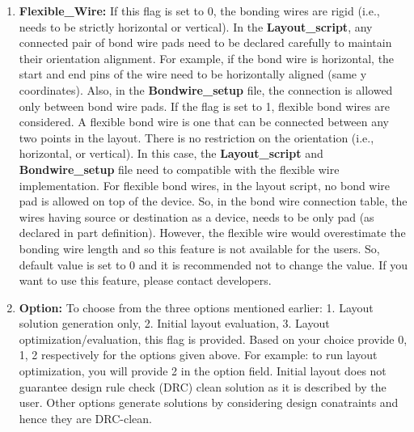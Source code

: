 \documentclass[11pt]{article}
\begin{document}
\begin{enumerate}
	 \item \textbf{Flexible\_Wire:}
	 If this flag is set to 0, the bonding wires are rigid (i.e., needs to be strictly horizontal or vertical). In the \textbf{Layout\_script}, any connected pair of bond wire pads need to be declared carefully to maintain their orientation alignment. For example, if the bond wire is horizontal, the start and end pins of the wire need to be horizontally aligned (same y coordinates). Also, in the \textbf{Bondwire\_setup} file, the connection is allowed only between bond wire pads.
     If the flag is set to 1, flexible bond wires are considered. A flexible bond wire is one that can be connected between any two points in the layout. There is no restriction on the orientation (i.e., horizontal, or vertical). In this case, the \textbf{Layout\_script} and \textbf{Bondwire\_setup} file need to compatible with the flexible wire implementation. For flexible bond wires, in the layout script, no bond wire pad is allowed on top of the device. So, in the bond wire connection table, the wires having source or destination as a device, needs to be only pad (as declared in part definition).
     However, the flexible wire would overestimate the bonding wire length and so this feature is not available for the users. So, default value is set to 0 and it is recommended not to change the value. If you want to use this feature, please contact developers.
     
     \item \textbf{Option:}
     To choose from the three options mentioned earlier: 1. Layout solution generation only, 2. Initial layout evaluation, 3. Layout optimization/evaluation, this flag is provided. Based on your choice provide 0, 1, 2 respectively for the options given above. For example: to run layout optimization, you will provide 2 in the option field. Initial layout does not guarantee design rule check (DRC) clean solution as it is described by the user. Other options generate solutions by considering design conatraints and hence they are DRC-clean. 
     

\end{enumerate}
\end{document}
